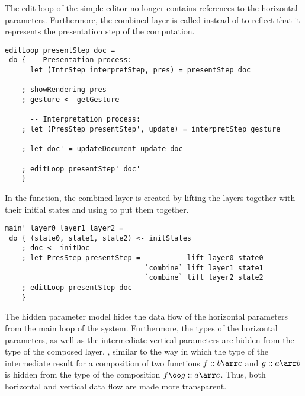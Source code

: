 
The edit loop of the simple editor no longer contains references to the horizontal parameters. Furthermore, the combined layer is called  instead of  to reflect that it represents the presentation step of the computation.

\begin{small}
\begin{verbatim}
editLoop presentStep doc = 
 do { -- Presentation process:
      let (IntrStep interpretStep, pres) = presentStep doc

    ; showRendering pres
    ; gesture <- getGesture
    
      -- Interpretation process:
    ; let (PresStep presentStep', update) = interpretStep gesture
    
    ; let doc' = updateDocument update doc
    
    ; editLoop presentStep' doc'
    }
\end{verbatim}
\end{small}

In the  function, the combined layer is created by lifting the layers together with their initial states and using  to put them together.

\begin{small}
\begin{verbatim}
main' layer0 layer1 layer2 =
 do { (state0, state1, state2) <- initStates
    ; doc <- initDoc 
    ; let PresStep presentStep =           lift layer0 state0 
                                 `combine` lift layer1 state1
                                 `combine` lift layer2 state2
    ; editLoop presentStep doc
    }
\end{verbatim}
\end{small}


The hidden parameter model hides the data flow of the horizontal parameters from the main loop of the system. Furthermore, the types of the horizontal parameters, as well as the intermediate vertical parameters are hidden from the type of the composed layer. \bc, similar to the way in which the type of the intermediate result for a composition of two functions $f :: b \arr c$ and $g :: a \arr b$ is hidden from the type of the composition $f \oo g :: a \arr c$. \ec Thus, both horizontal and vertical data flow are made more transparent. 


